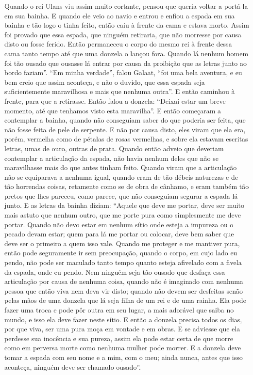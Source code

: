 Quando o rei Ulans viu assim muito cortante, pensou que queria voltar a portá-la
em sua bainha. E quando ele veio ao navio e entrou e enfiou a espada em sua
bainha e tão logo o tinha feito, então caiu à frente da cama e estava morto.
Assim foi provado que essa espada, que ninguém retiraria, que não morresse por
causa disto ou fosse ferido. Então permaneceu o corpo do mesmo rei à frente
dessa cama tanto tempo até que uma donzela o lançou fora. Quando lá nenhum
homem foi tão ousado que ousasse lá entrar por causa da proibição que as letras
junto ao bordo faziam”. “Em minha verdade”, falou Galaat, “foi
uma bela aventura, e eu bem creio que assim aconteça, e não o duvido, que essa
espada seja suficientemente maravilhosa e mais que nenhuma outra”. E então
caminhou à frente, para que a retirasse. Então falou a donzela: “Deixai estar
um breve momento, até que tenhamos visto esta maravilha”. E então começaram a
contemplar a bainha, quando não conseguiam saber do que poderia ser feita, que
não fosse feita de pele de serpente. E não por causa disto, eles viram que ela
era, porém, vermelha como de pétalas de rosas vermelhas, e sobre ela estavam
escritas letras, umas de ouro, outras de prata. Quando então adveio que
deveriam contemplar a articulação da espada, não havia nenhum deles que não se
maravilhasse mais do que antes tinham feito. Quando viram que a articulação não
se equiparava a nenhuma igual, quando eram de tão débeis naturezas e de tão
horrendas coisas, retamente como se de obra de cânhamo, e eram também tão
pretos que lhes pareceu, como parece, que não conseguiam segurar a espada lá
junto. E as letras da bainha diziam: “Aquele que deve me portar, deve ser muito
mais astuto que nenhum outro, que me porte pura como simplesmente me deve
portar. Quando não devo estar em nenhum sítio onde esteja a impureza ou o
pecado devam estar; quem para lá me portar ou colocar, deve bem saber que deve
ser o primeiro a quem isso vale. Quando me proteger e me mantiver pura, então
pode seguramente ir sem preocupação, quando o corpo, em cujo lado eu pendo, não
pode ser maculado tanto tempo quanto esteja afivelado com a fivela da espada,
onde eu pendo. Nem ninguém seja tão ousado que desfaça essa articulação por
causa de nenhuma coisa, quando não é imaginado com nenhuma pessoa que então
viva nem deva vir disto; quando não devem ser desfeitas senão pelas mãos de uma
donzela que lá seja filha de um rei e de uma rainha. Ela pode fazer uma troca e
pode pôr outra em seu lugar, a mais adorável que saiba no mundo, e isso ela
deve fazer neste sítio. E então a donzela precisa todos os dias, por que viva,
ser uma pura moça em vontade e em obras. E se adviesse que ela perdesse sua
inocência e sua pureza, assim ela pode estar certa de que morre como em
perversa morte como nenhuma mulher pode morrer. E a donzela deve tomar a espada
com seu nome e a mim, com o meu; ainda nunca, antes que isso aconteça, ninguém
deve ser chamado ousado”. 

